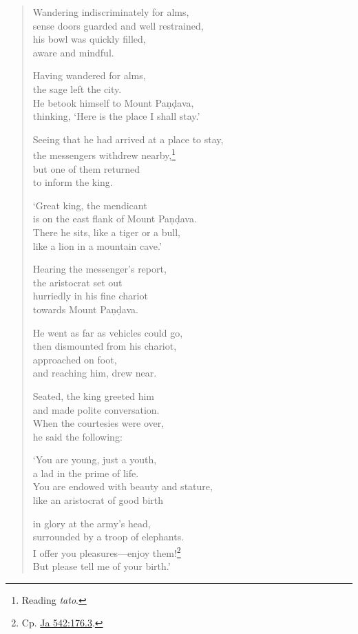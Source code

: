 \documentclass[12pt,openany]{book}%
\begin{document}
\begin{verse}
Wandering indiscriminately for alms, \\
sense doors guarded and well restrained, \\
his bowl was quickly filled, \\
aware and mindful. 

Having wandered for alms, \\
the sage left the city. \\
He betook himself to Mount \textsanskrit{Paṇḍava}, \\
thinking, ‘Here is the place I shall stay.’ 

Seeing that he had arrived at a place to stay, \\
the messengers withdrew nearby,\footnote{Reading \textit{tato}. } \\
but one of them returned \\
to inform the king. 

‘Great king, the mendicant \\
is on the east flank of Mount \textsanskrit{Paṇḍava}. \\
There he sits, like a tiger or a bull, \\
like a lion in a mountain cave.’ 

Hearing the messenger’s report, \\
the aristocrat set out \\
hurriedly in his fine chariot \\
towards Mount \textsanskrit{Paṇḍava}. 

He went as far as vehicles could go, \\
then dismounted from his chariot, \\
approached on foot, \\
and reaching him, drew near. 

Seated, the king greeted him \\
and made polite conversation. \\
When the courtesies were over, \\
he said the following: 

‘You are young, just a youth, \\
a lad in the prime of life. \\
You are endowed with beauty and stature, \\
like an aristocrat of good birth 

in glory at the army’s head, \\
surrounded by a troop of elephants. \\
I offer you pleasures—enjoy them!\footnote{Cp. \href{https://suttacentral.net/ja542/en/sujato\#176.3}{Ja 542:176.3}. } \\
But please tell me of your birth.’ 


\end{verse}
\end{document}

